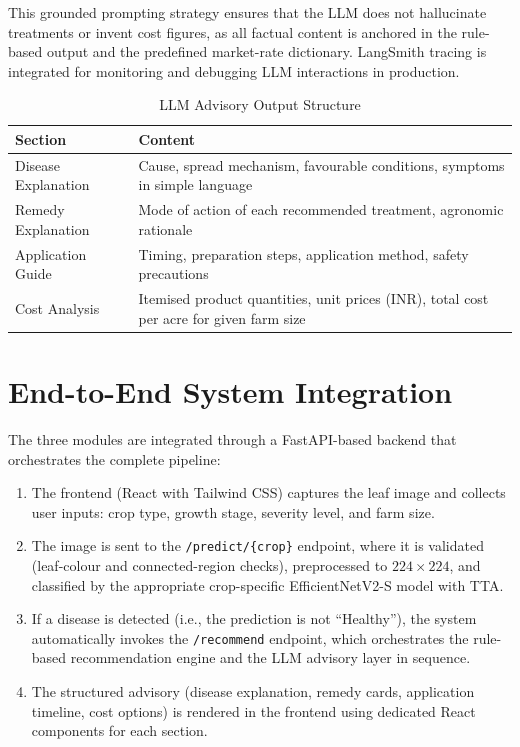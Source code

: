 \documentclass[12pt,a4paper]{report}
\begin{document}
This grounded prompting strategy ensures that the LLM does not hallucinate treatments or invent cost figures, as all factual content is anchored in the rule-based output and the predefined market-rate dictionary. LangSmith tracing is integrated for monitoring and debugging LLM interactions in production.

\begin{table}[H]
\centering
\caption{LLM Advisory Output Structure}
\label{tab:llm-output}
\begin{tabular}{lp{9cm}}
\toprule
Section & Content \\
\midrule
Disease Explanation & Cause, spread mechanism, favourable conditions, symptoms in simple language \\
Remedy Explanation & Mode of action of each recommended treatment, agronomic rationale \\
Application Guide & Timing, preparation steps, application method, safety precautions \\
Cost Analysis & Itemised product quantities, unit prices (INR), total cost per acre for given farm size \\
\bottomrule
\end{tabular}
\end{table}

\section{End-to-End System Integration}
The three modules are integrated through a FastAPI-based backend that orchestrates the complete pipeline:

\begin{enumerate}
    \item The frontend (React with Tailwind CSS) captures the leaf image and collects user inputs: crop type, growth stage, severity level, and farm size.
    \item The image is sent to the \texttt{/predict/\{crop\}} endpoint, where it is validated (leaf-colour and connected-region checks), preprocessed to $224 \times 224$, and classified by the appropriate crop-specific EfficientNetV2-S model with TTA.
    \item If a disease is detected (i.e., the prediction is not ``Healthy''), the system automatically invokes the \texttt{/recommend} endpoint, which orchestrates the rule-based recommendation engine and the LLM advisory layer in sequence.
    \item The structured advisory (disease explanation, remedy cards, application timeline, cost options) is rendered in the frontend using dedicated React components for each section.
\end{enumerate}
\end{document}
